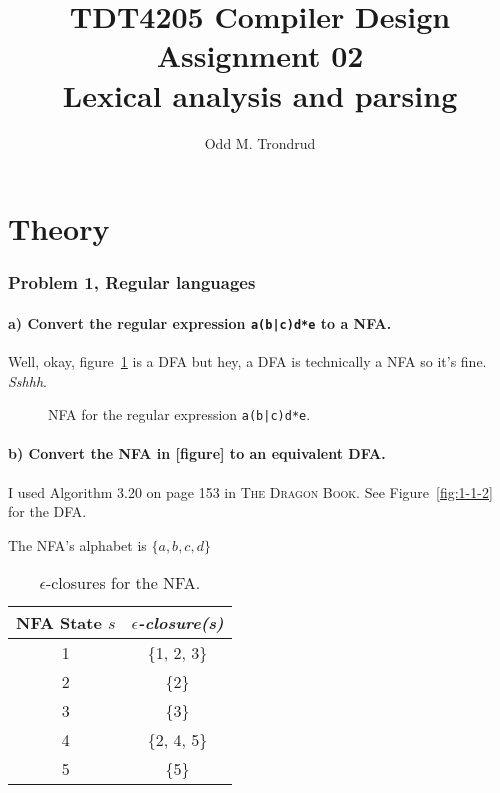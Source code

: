 \documentclass[12pt]{article}
\title{TDT4205 Compiler Design\\
Assignment 02\\
\textbf{Lexical analysis and parsing}}
\author{Odd M. Trondrud}
\begin{document}
\maketitle

\part{Theory}
\section{Problem 1, Regular languages}
\subsection{a) Convert the regular expression \texttt{a(b|c)d*e} to a NFA.}
Well, okay, figure~\ref{fig:1-1-a} is a DFA but hey, a DFA is technically a NFA so it's fine. \textit{Sshhh}.
\begin{figure}[H]
\begin{center}

\caption{NFA for the regular expression \texttt{a(b|c)d*e}.}
\label{fig:1-1-a}
\end{center}
\end{figure}

\subsection{b) Convert the NFA in [figure] to an equivalent DFA.}
I used Algorithm 3.20 on page 153 in \textsc{The Dragon Book}.
See Figure~\ref{fig:1-1-2} for the DFA.

The NFA's alphabet is $\{a, b, c, d\}$

\begin{table}[H]
\begin{center}
	\begin{tabular}{|c|c|}
	\hline
	NFA State $s$ & $\epsilon$\textit{-closure(s)} \\
   	\hline
	1 & \{1, 2, 3\} \\
   	\hline
	2 & \{2\} \\
	\hline
	3 & \{3\} \\
   	\hline
	4 & \{2, 4, 5\} \\
   	\hline
	5 & \{5\} \\
	\hline
	\end{tabular}
	\caption{$\epsilon$-closures for the NFA.}
\end{center}
\end{table}
\end{document}
